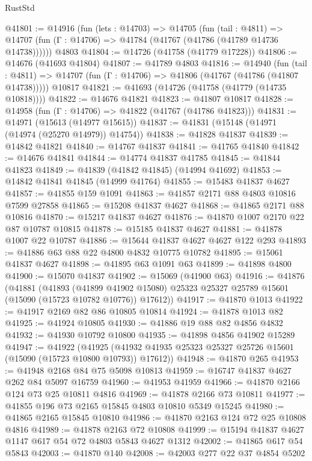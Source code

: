 \begin{lexlean}{RustStd}
\begin{coremodule}
@41801 := @14916
    (fun (lets : @14703) =>
    @14705
      (fun (tail : @4811) =>
      @14707 (fun (Γ : @14706) => @41784 (@41767 (@41786 (@41789 @14736 @14738))))))
    @4803
@41804 := @14726 (@41758 (@41779 @17228))
@41806 := @14676 (@41693 @41804)
@41807 := @41789 @4803
@41816 := @14940
    (fun (tail : @4811) => @14707 (fun (Γ : @14706) => @41806 (@41767 (@41786 (@41807 @14738)))))
    @10817
@41821 := @41693 (@14726 (@41758 (@41779 (@14735 @10818))))
@41822 := @14676 @41821
@41823 := @41807 @10817
@41828 := @14958 (fun (Γ : @14706) => @41822 (@41767 (@41786 @41823)))
@41831 := @14971 (@15613 (@14977 @15615))
@41837 := @41831 (@15148 (@14971 (@14974 (@25270 @14979)) @14754))
@41838 := @41828 @41837
@41839 := @14842 @41821
@41840 := @14767 @41837
@41841 := @41765 @41840
@41842 := @14676 @41841
@41844 := @14774 @41837 @41785
@41845 := @41844 @41823
@41849 := @41839 (@41842 @41845) (@14994 @41692)
@41853 := @14842 @41841 @41845 (@14999 @41764)
@41855 := @15483 @41837 @4627
@41857 := @41855 @159 @1091
@41863 := @41857 @2171 @88 @4803 @10816 @7599 @27858
@41865 := @15208 @41837 @4627
@41868 := @41865 @2171 @88 @10816
@41870 := @15217 @41837 @4627
@41876 := @41870 @1007 @2170 @22 @87 @10787 @10815
@41878 := @15185 @41837 @4627
@41881 := @41878 @1007 @22 @10787
@41886 := @15644 @41837 @4627 @4627 @122 @293
@41893 := @41886 @63 @88 @22 @4800 @4832 @10775 @10782
@41895 := @15061 @41837 @4627
@41898 := @41895 @63 @1091 @63
@41899 := @41898 @4800
@41900 := @15070 @41837
@41902 := @15069 (@41900 @63)
@41916 := @41876
    (@41881
      (@41893
        (@41899 @41902 @15080)
        @25323
        @25327
        @25789
        @15601
        (@15090 (@15723 @10782 @10776))
        @17612))
@41917 := @41870 @1013
@41922 := @41917 @2169 @82 @86 @10805 @10814
@41924 := @41878 @1013 @82
@41925 := @41924 @10805
@41930 := @41886 @19 @88 @82 @4856 @4832
@41932 := @41930 @10792 @10800
@41935 := @41898 @4856 @41902 @15289
@41947 := @41922
    (@41925 (@41932 @41935 @25323 @25327 @25726 @15601 (@15090 (@15723 @10800 @10793)) @17612))
@41948 := @41870 @265
@41953 := @41948 @2168 @84 @75 @5098 @10813
@41959 := @16747 @41837 @4627 @262 @84 @5097 @16759
@41960 := @41953 @41959
@41966 := @41870 @2166 @124 @73 @25 @10811 @4816
@41969 := @41878 @2166 @73 @10811
@41977 := @41855 @196 @73 @2165 @15845 @4803 @10810 @5349 @15245
@41980 := @41865 @2165 @15845 @10810
@41986 := @41870 @2163 @124 @72 @25 @10808 @4816
@41989 := @41878 @2163 @72 @10808
@41999 := @15194 @41837 @4627 @1147 @617 @54 @72 @4803 @5843 @4627 @1312
@42002 := @41865 @617 @54 @5843
@42003 := @41870 @140
@42008 := @42003 @277 @22 @37 @4854 @5202

\end{coremodule}
\end{lexlean}
